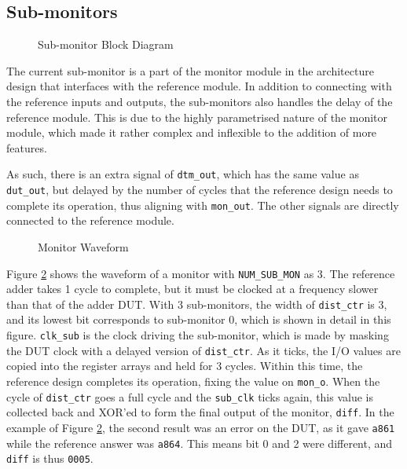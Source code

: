 \subsection{Sub-monitors}

\begin{figure}[H]
  \centering
  
  \caption{Sub-monitor Block Diagram}
  \label{SubmonBlk}
\end{figure}

The current sub-monitor is a part of the monitor module in the architecture design that interfaces with the reference module.
In addition to connecting with the reference inputs and outputs, the sub-monitors also handles the delay of the reference module.
This is due to the highly parametrised nature of the monitor module, which made it rather complex and inflexible to the addition of more features.

As such, there is an extra signal of \texttt{dtm\_out}, which has the same value as \texttt{dut\_out}, but delayed by the number of cycles that the reference design needs to complete its operation, thus aligning with \texttt{mon\_out}.
The other signals are directly connected to the reference module.

\begin{figure}[H]
  \centering
  
  \caption{Monitor Waveform}
  \label{MonitorWave}
\end{figure}

Figure \ref{MonitorWave} shows the waveform of a monitor with \texttt{NUM\_SUB\_MON} as 3.
The reference adder takes 1 cycle to complete, but it must be clocked at a frequency slower than that of the adder DUT.
With 3 sub-monitors, the width of \texttt{dist\_ctr} is 3, and its lowest bit corresponds to sub-monitor 0, which is shown in detail in this figure.
\texttt{clk\_sub} is the clock driving the sub-monitor, which is made by masking the DUT clock with a delayed version of \texttt{dist\_ctr}.
As it ticks, the I/O values are copied into the register arrays and held for 3 cycles.
Within this time, the reference design completes its operation, fixing the value on \texttt{mon\_o}.
When the cycle of \texttt{dist\_ctr} goes a full cycle and the \texttt{sub\_clk} ticks again, this value is collected back and XOR'ed to form the final output of the monitor, \texttt{diff}.
In the example of Figure \ref{MonitorWave}, the second result was an error on the DUT, as it gave \texttt{a861} while the reference answer was \texttt{a864}.
This means bit 0 and 2 were different, and \texttt{diff} is thus \texttt{0005}.

